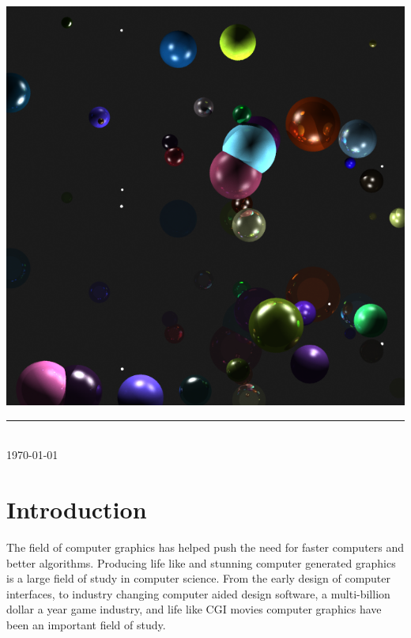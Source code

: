 \documentclass[11pt,a4paper,oneside]{article}
\newcommand{\HRule}{\rule{\linewidth}{0.5mm}}
\begin{document}
\begin{titlepage}
\begin{center}
		\begin{center}
			\includegraphics[scale=0.45]{cover.png} 
		\end{center}
	
    
        \HRule\\[0.5cm]
        { \large \today }
    \end{center}
\end{titlepage}

\begin{abstract}



\end{abstract}
\newpage 

\section{ Introduction }
The field of computer graphics has helped push the need for faster computers and better algorithms.  Producing life like and stunning computer generated graphics is a large field of study in computer science.  From the early design of computer interfaces, to industry changing computer aided design software, a multi-billion dollar a year game industry, and life like CGI movies\cite{gaming:2007} computer graphics have been an important field of study.   
\end{document}
